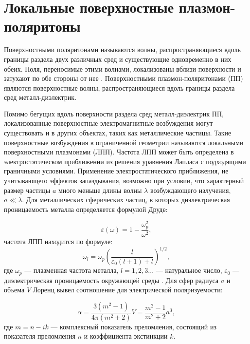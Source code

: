 \section{Локальные поверхностные плазмон-поляритоны}

Поверхностными поляритонами называются волны, распространяющиеся вдоль границы раздела двух различных сред и существующие одновременно в них обеих. Поля, переносимые этими волнами, локализованы вблизи поверхности и затухают по обе стороны от нее \cite{Libenson}. Поверхностными плазмон-поляритонами (ПП) являются поверхностные волны, распространяющиеся вдоль границы раздела сред металл-диэлектрик.

Помимо бегущих вдоль поверхности раздела сред металл-диэлектрик ПП, локализованные поверхностные электромагнитные возбуждения могут существовать и в других объектах, таких как металлические частицы. Такие поверхностные возбуждения в ограниченной геометрии называются локальными поверхностными плазмонами (ЛПП). Частота ЛПП может быть определена в электростатическом приближении из решения уравнения Лапласа с подходящими граничными условиями. Применение электростатического приближения, не учитывающего эффектов запаздывания, возможно при условии, что характерный размер частицы $ a $ много меньше длины волны $ \lambda $ возбуждающего излучения, $ a \ll \lambda $. Для металлических сферических частиц, в которых диэлектрическая проницаемость металла определяется формулой Друде:

\begin{equation}
\varepsilon (\omega) = 1 - \frac{\omega ^2 _p}{\omega ^2} 
\label{eq:EpsilonFreeElectron},
\end{equation}
частота ЛПП находится по формуле:
\begin{equation}
\omega _l = \omega _p \left(\frac{l}{\varepsilon _0 (l + 1) + l}\right)^{1/2},  
\label{eq:FrequencyLocalSPP}
\end{equation}
где $ \omega _p $ --- плазменная частота металла, $  l = 1, 2, 3... $ --- натуральное число, $ \varepsilon _0 $ --- диэлектрическая проницаемость окружающей среды \cite{Zayats}. Для сфер радиуса $ a $ и объема $ V $ Лоренц вывел соотношение для электрической поляризуемости:

\begin{equation}
\alpha = \frac{3 (m^2 - 1)}{4 \pi (m^2 + 2)} V = \frac{m^2 - 1}{m^2 + 2} a^3,
\label{eq:polarizability}
\end{equation}
где $ m = n - ik $ --- комплексный показатель преломления, состоящий из показателя преломления $ n $ и коэффициента экстинкции $ k $.

